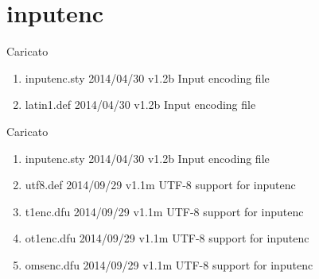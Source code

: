 \section{inputenc}		 

Caricato 
\begin{enumerate}
\item inputenc.sty 2014/04/30 v1.2b Input encoding file
\item latin1.def 2014/04/30 v1.2b Input encoding file	
\end{enumerate}		

Caricato 
\begin{enumerate}
\item inputenc.sty 2014/04/30 v1.2b Input encoding file
\item utf8.def 2014/09/29 v1.1m UTF-8 support for inputenc
\item t1enc.dfu 2014/09/29 v1.1m UTF-8 support for inputenc
\item ot1enc.dfu 2014/09/29 v1.1m UTF-8 support for inputenc
\item omsenc.dfu 2014/09/29 v1.1m UTF-8 support for inputenc
\end{enumerate}			 
%
